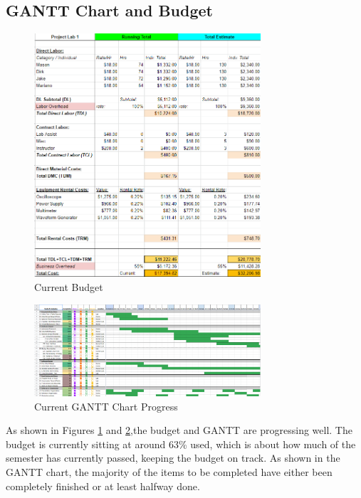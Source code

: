 \documentclass[UTF8, 12pt]{article}
\begin{document}
\subsection{GANTT Chart and Budget}
    \begin{figure}[h]
        \centering
        \includegraphics[width=0.75\textwidth]{budget.png}
        \caption{Current Budget}
        \label{bud_fig}
    \end{figure}
    \begin{figure}[h]
        \centering
        \includegraphics[width=0.75\textwidth]{gantt.png}
        \caption{Current GANTT Chart Progress}
        \label{gan_fig}
    \end{figure}
    As shown in Figures \ref{bud_fig} and \ref{gan_fig},the budget and GANTT are progressing well. The budget is currently sitting at around 63\% used, which is about how much of the semester has currently passed, keeping the budget on track. As shown in the GANTT chart, the majority of the items to be completed have either been completely finished or at least halfway done.
\end{document}

